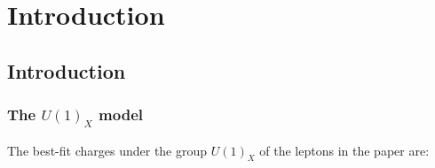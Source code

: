
\chapter{Introduction}  %

\ifpdf
    \graphicspath{{Chapter1/Figs/Raster/}{Chapter1/Figs/PDF/}{Chapter1/Figs/}}
\else
    \graphicspath{{Chapter1/Figs/Vector/}{Chapter1/Figs/}}
\fi


\section{\label{sec:level1} Introduction}

\subsection{\label{sec:level2}The $U(1)_X$ model}

 The best-fit charges under the group $U(1)_X$ of the leptons in the paper \cite{allanach_plan_2025} are:

